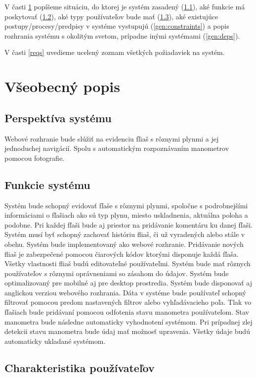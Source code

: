 \documentclass[hreffootnote]{zah}
\begin{document}
V časti \ref{general} popíšeme situáciu, do ktorej je systém zasadený (\ref{gen:perspective}), aké funkcie má poskytovať (\ref{gen:functions}), aké typy používateľov bude mať (\ref{gen:users}), aké existujúce postupy/procesy/predpisy v systéme vystupujú (\ref{gen:constraints}) a popis rozhrania systému s okolitým svetom, prípadne inými systémami (\ref{gen:deps}).

V časti \ref{reqs} uvedieme ucelený zoznam všetkých požiadaviek na systém.

\cleardoublepage
\section{Všeobecný popis}
\label{general}

\subsection{Perspektíva systému}
\label{gen:perspective}
Webové rozhranie bude slúžiť na evidenciu fľiaš s rôznymi plynmi a jej jednoduchej navigácií. Spolu s automatickým rozpoznávaním manometrov pomocou fotografie.

\subsection{Funkcie systému}
\label{gen:functions}
Systém bude schopný evidovať fľaše s rôznymi plynmi, spoločne s podrobnejšími informáciami o fľašiach ako sú typ plynu, miesto uskladnenia, aktuálna poloha a podobne. Pri každej fľaši bude aj priestor na pridávanie komentáru ku danej fľaši. Systém musí byť schopný zachovať históriu fliaš, či už vyradených alebo stále v obehu. Systém bude implementovaný ako webové rozhranie. Pridávanie nových fliaš je zabezpečené pomocou čiarových kódov ktorými disponuje každá fľaša. Všetky vlastnosti fliaš budú editovateľné používateľmi. Systém bude mať rôznych používateľov s rôznymi oprávneniami so zásahom do údajov. Systém bude optimalizovaný pre mobilné aj pre desktop prostredia. Systém bude disponovať aj anglickou verziou webového rozhrania. Dáta v systéme bude používateľ schopný filtrovať pomocou predom nastavených filtrov alebo vyhľadávacieho poľa. Tlak vo fľašiach bude pridávaní pomocou odfotenia stavu manometra používateľom. Stav manometra bude následne automaticky vyhodnotení systémom. Pri prípadnej zlej detekcii stavu manometra bude údaj mať možnosť upravenia. Všetky údaje budú automaticky ukladané systémom.

\subsection{Charakteristika používateľov}
\label{gen:users}
\end{document}
